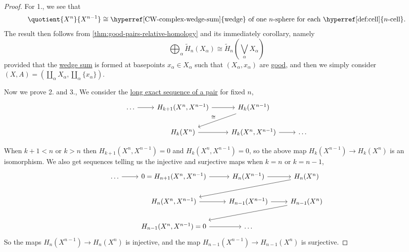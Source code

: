 \begin{proof}
	For 1., we see that
	\[
		\quotient{X^n}{X^{n-1}} \cong \text{\hyperref[CW-complex-wedge-sum]{wedge} of one \(n\)-sphere for each \hyperref[def:cell]{\(n\)-cell}}.
	\]
	The result then follows from \autoref{thm:good-pairs-relative-homology} and its immediately corollary, namely
	\[
		\bigoplus_\alpha \widetilde{H} _n(X_\alpha )\cong \widetilde{H} _n\left(\bigvee_\alpha X_\alpha \right)
	\]
	provided that the \hyperref[CW-complex-wedge-sum]{wedge sum} is formed at basepoints \(x_\alpha \in X_\alpha \) such that \((X_\alpha , x_\alpha )\)
	are \hyperref[def:good-pair]{good}, and then we simply consider \((X, A) = (\coprod_{\alpha } X_\alpha , \coprod_{\alpha } \{x_\alpha\})\).

	Now we prove 2. and 3., We consider the \hyperref[thm:long-exact-sequence-of-a-pair]{long exact sequence of a pair} for fixed \(n\),
	\[
		\begin{tikzcd}
			\ldots & {H_{k+1}(X^n, X^{n-1})} & {H_k(X^{n-1})} \\
			& {H_k(X^n)} & {H_k(X^n, X^{n-1})} & \ldots
			\arrow[from=1-1, to=1-2]
			\arrow[from=1-2, to=1-3]
			\arrow["\cong"', from=1-3, to=2-2]
			\arrow[from=2-2, to=2-3]
			\arrow[from=2-3, to=2-4]
		\end{tikzcd}
	\]

	When \(k + 1 < n\) or \(k > n\) then \(H_{k + 1}(X^n, X^{n - 1}) = 0\) and \(H_k(X^n, X^{n - 1}) = 0\), so the above map \(H_k(X^{n - 1}) \to H_k(X^n)\)
	is an isomorphism. We also get sequences telling us the injective and surjective maps when \(k = n\) or \(k = n - 1\),
	\[
		\begin{tikzcd}
			\ldots & {0=H_{n+1}(X^n, X^{n-1})} & {H_n(X^{n-1})} & {H_n(X^n)} \\
			& {H_{n}(X^n, X^{n-1})} & {H_{n-1}(X^{n-1})} & {H_{n-1}(X^n)} \\
			& {H_{n-1}(X^n, X^{n-1})=0} & \ldots
			\arrow[from=1-1, to=1-2]
			\arrow[from=1-2, to=1-3]
			\arrow[from=1-3, to=1-4]
			\arrow[from=1-4, to=2-2]
			\arrow[from=2-2, to=2-3]
			\arrow[from=2-3, to=2-4]
			\arrow[from=2-4, to=3-2]
			\arrow[from=3-2, to=3-3]
		\end{tikzcd}
	\]
	So the maps \(H_n(X^{n - 1}) \to H_n(X^n)\) is injective, and the map \(H_{n - 1}(X^{n - 1}) \to H_{n - 1}(X^n)\) is surjective.


\end{proof}
